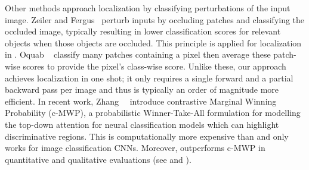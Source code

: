 Other methods approach localization by classifying perturbations of the input image.
Zeiler and Fergus~\cite{zeiler_eccv14} perturb inputs by occluding patches and classifying the occluded image, typically resulting in lower classification scores for relevant objects when those objects are occluded.
This principle is applied for localization in \cite{bazzani2016self}. %
Oquab \etal~\cite{oquab_cvpr14} classify many patches containing a pixel then average these patch-wise
scores to provide the pixel's class-wise score.
Unlike these, our approach achieves localization in one shot; it only requires a single forward and a partial backward pass per image and thus is typically an order of magnitude more efficient.
In recent work, Zhang~\etal~\cite{zhang2016top} introduce contrastive Marginal Winning Probability (c-MWP), a probabilistic Winner-Take-All formulation for modelling the top-down attention for neural classification models which can highlight discriminative regions. 
This is computationally more expensive than \gcam{} and only works for
image classification CNNs. 
Moreover, \gcam{} outperforms c-MWP in quantitative and qualitative evaluations (see  and ).


